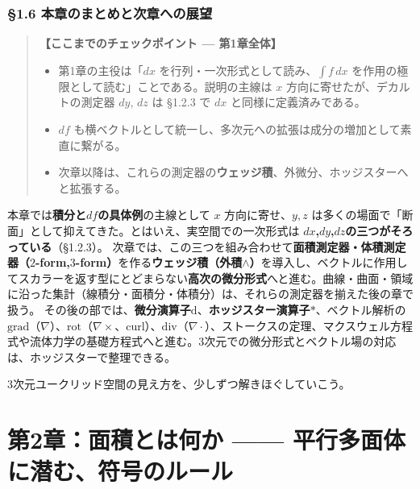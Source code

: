 \documentclass[a4paper,12pt,openany]{book}
\begin{document}
\hypertarget{ux672cux7ae0ux306eux307eux3068ux3081ux3068ux6b21ux7ae0ux3078ux306eux5c55ux671b}{%
\subsection{§1.6
本章のまとめと次章への展望}\label{ux672cux7ae0ux306eux307eux3068ux3081ux3068ux6b21ux7ae0ux3078ux306eux5c55ux671b}}

\begin{quote}
\textbf{【ここまでのチェックポイント — 第1章全体】}

\begin{itemize}
\item
  第1章の主役は「\(dx\) を行列・一次形式として読み、\(\int f\,dx\)
  を作用の極限として読む」ことである。説明の主線は \(x\)
  方向に寄せたが、デカルトの測定器 \(dy\), \(dz\) は §1.2.3 で \(dx\)
  と同様に定義済みである。
\item
  \(df\)
  も横ベクトルとして統一し、多次元への拡張は成分の増加として素直に繋がる。
\item
  次章以降は、これらの測定器の\textbf{ウェッジ積}、外微分、ホッジスターへと拡張する。
\end{itemize}
\end{quote}

本章では\textbf{積分と}\(df\)\textbf{の具体例}の主線として \(x\)
方向に寄せ、\(y,z\)
は多くの場面で「断面」として抑えてきた。とはいえ、実空間での一次形式は
\(dx\)\textbf{,}\(dy\)\textbf{,}\(dz\)\textbf{の三つがそろっている}（§1.2.3）。
次章では、この三つを組み合わせて\textbf{面積測定器・体積測定器（}\(2\)\textbf{-form,}\(3\)\textbf{-form）}を作る\textbf{ウェッジ積（外積}\(\wedge\)\textbf{）}を導入し、ベクトルに作用してスカラーを返す型にとどまらない\textbf{高次の微分形式}へと進む。曲線・曲面・領域に沿った集計（線積分・面積分・体積分）は、それらの測定器を揃えた後の章で扱う。
その後の部では、\textbf{微分演算子}\(\mathrm{d}\)、\textbf{ホッジスター演算子}\(\ast\)、ベクトル解析の
\(\mathrm{grad}\)（\(\nabla\)）、\(\mathrm{rot}\)（\(\nabla\times\)、\(\mathrm{curl}\)）、\(\mathrm{div}\)（\(\nabla\cdot\)）、ストークスの定理、マクスウェル方程式や流体力学の基礎方程式へと進む。3次元での微分形式とベクトル場の対応は、ホッジスターで整理できる。

3次元ユークリッド空間の見え方を、少しずつ解きほぐしていこう。

\newpage

\hypertarget{ux7b2c2ux7ae0ux9762ux7a4dux3068ux306fux4f55ux304b-ux5e73ux884cux591aux9762ux4f53ux306bux6f5cux3080ux7b26ux53f7ux306eux30ebux30fcux30eb}{%
\chapter{第2章：面積とは何か ——
平行多面体に潜む、符号のルール}\label{ux7b2c2ux7ae0ux9762ux7a4dux3068ux306fux4f55ux304b-ux5e73ux884cux591aux9762ux4f53ux306bux6f5cux3080ux7b26ux53f7ux306eux30ebux30fcux30eb}}
\end{document}
